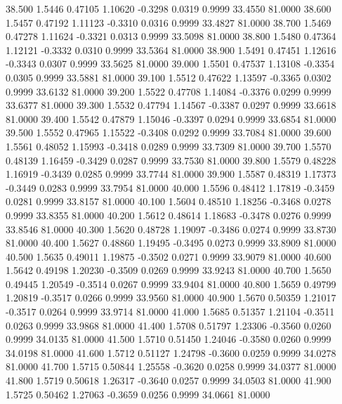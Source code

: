  38.500   1.5446   0.47105   1.10620  -0.3298   0.0319   0.9999  33.4550  81.0000
  38.600   1.5457   0.47192   1.11123  -0.3310   0.0316   0.9999  33.4827  81.0000
  38.700   1.5469   0.47278   1.11624  -0.3321   0.0313   0.9999  33.5098  81.0000
  38.800   1.5480   0.47364   1.12121  -0.3332   0.0310   0.9999  33.5364  81.0000
  38.900   1.5491   0.47451   1.12616  -0.3343   0.0307   0.9999  33.5625  81.0000
  39.000   1.5501   0.47537   1.13108  -0.3354   0.0305   0.9999  33.5881  81.0000
  39.100   1.5512   0.47622   1.13597  -0.3365   0.0302   0.9999  33.6132  81.0000
  39.200   1.5522   0.47708   1.14084  -0.3376   0.0299   0.9999  33.6377  81.0000
  39.300   1.5532   0.47794   1.14567  -0.3387   0.0297   0.9999  33.6618  81.0000
  39.400   1.5542   0.47879   1.15046  -0.3397   0.0294   0.9999  33.6854  81.0000
  39.500   1.5552   0.47965   1.15522  -0.3408   0.0292   0.9999  33.7084  81.0000
  39.600   1.5561   0.48052   1.15993  -0.3418   0.0289   0.9999  33.7309  81.0000
  39.700   1.5570   0.48139   1.16459  -0.3429   0.0287   0.9999  33.7530  81.0000
  39.800   1.5579   0.48228   1.16919  -0.3439   0.0285   0.9999  33.7744  81.0000
  39.900   1.5587   0.48319   1.17373  -0.3449   0.0283   0.9999  33.7954  81.0000
  40.000   1.5596   0.48412   1.17819  -0.3459   0.0281   0.9999  33.8157  81.0000
  40.100   1.5604   0.48510   1.18256  -0.3468   0.0278   0.9999  33.8355  81.0000
  40.200   1.5612   0.48614   1.18683  -0.3478   0.0276   0.9999  33.8546  81.0000
  40.300   1.5620   0.48728   1.19097  -0.3486   0.0274   0.9999  33.8730  81.0000
  40.400   1.5627   0.48860   1.19495  -0.3495   0.0273   0.9999  33.8909  81.0000
  40.500   1.5635   0.49011   1.19875  -0.3502   0.0271   0.9999  33.9079  81.0000
  40.600   1.5642   0.49198   1.20230  -0.3509   0.0269   0.9999  33.9243  81.0000
  40.700   1.5650   0.49445   1.20549  -0.3514   0.0267   0.9999  33.9404  81.0000
  40.800   1.5659   0.49799   1.20819  -0.3517   0.0266   0.9999  33.9560  81.0000
  40.900   1.5670   0.50359   1.21017  -0.3517   0.0264   0.9999  33.9714  81.0000
  41.000   1.5685   0.51357   1.21104  -0.3511   0.0263   0.9999  33.9868  81.0000
  41.400   1.5708   0.51797   1.23306  -0.3560   0.0260   0.9999  34.0135  81.0000
  41.500   1.5710   0.51450   1.24046  -0.3580   0.0260   0.9999  34.0198  81.0000
  41.600   1.5712   0.51127   1.24798  -0.3600   0.0259   0.9999  34.0278  81.0000
  41.700   1.5715   0.50844   1.25558  -0.3620   0.0258   0.9999  34.0377  81.0000
  41.800   1.5719   0.50618   1.26317  -0.3640   0.0257   0.9999  34.0503  81.0000
  41.900   1.5725   0.50462   1.27063  -0.3659   0.0256   0.9999  34.0661  81.0000
